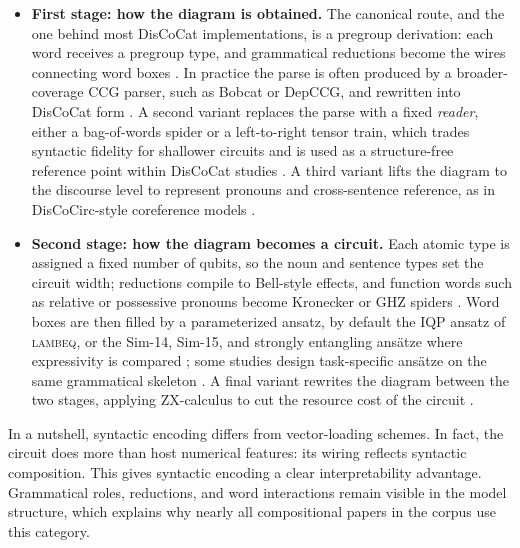 \documentclass{ieeeaccess}
\begin{document}
\begin{itemize}
    \item \textbf{First stage: how the diagram is obtained.} The canonical route, and the one behind most DisCoCat implementations, is a pregroup derivation: each word receives a pregroup type, and grammatical reductions become the wires connecting word boxes \cite{meichanetzidis_quantum_2021,meichanetzidis_grammar-aware_2023,lorenz_qnlp_2023}. In practice the parse is often produced by a broader-coverage CCG parser, such as Bobcat or DepCCG, and rewritten into DisCoCat form \cite{abiwardani_generalized_2025,ruskanda_quantum_2022,r_quantum_2023}. A second variant replaces the parse with a fixed \emph{reader}, either a bag-of-words spider or a left-to-right tensor train, which trades syntactic fidelity for shallower circuits and is used as a structure-free reference point within DisCoCat studies \cite{lorenz_qnlp_2023,liu_research_2024,peral-garcia_comparing_2024}. A third variant lifts the diagram to the discourse level to represent pronouns and cross-sentence reference, as in DisCoCirc-style coreference models \cite{wazni_large_2024}.
    \item \textbf{Second stage: how the diagram becomes a circuit.} Each atomic type is assigned a fixed number of qubits, so the noun and sentence types set the circuit width; reductions compile to Bell-style effects, and function words such as relative or possessive pronouns become Kronecker or GHZ spiders \cite{meichanetzidis_grammar-aware_2023}. Word boxes are then filled by a parameterized ansatz, by default the IQP ansatz of \textsc{lambeq}, or the Sim-14, Sim-15, and strongly entangling ans\"atze where expressivity is compared \cite{lorenz_qnlp_2023,castillo_comparative_2025}; some studies design task-specific ans\"atze on the same grammatical skeleton \cite{ruskanda_simple_2023,abiwardani_generalized_2025}. A final variant rewrites the diagram between the two stages, applying ZX-calculus to cut the resource cost of the circuit \cite{sreedhar_towards_2025}.
\end{itemize}

In a nutshell, syntactic encoding differs from vector-loading schemes. In fact, the circuit does more than host numerical features: its wiring reflects syntactic composition. This gives syntactic encoding a clear interpretability advantage. Grammatical roles, reductions, and word interactions remain visible in the model structure, which explains why nearly all compositional papers in the corpus use this category. 
\end{document}
